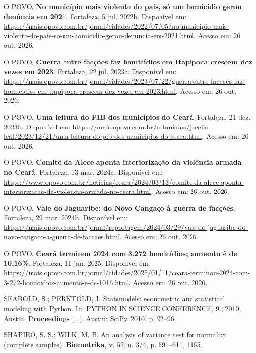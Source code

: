 \documentclass[12pt,a4paper]{article}
\begin{document}
\begin{description}
		\item O POVO. \textbf{No município mais violento do país, só um homicídio gerou denúncia em 2021}. Fortaleza, 5 jul. 2022b. Disponível em: \url{https://mais.opovo.com.br/jornal/cidades/2022/07/05/no-municipio-mais-violento-do-pais-so-um-homicidio-gerou-denuncia-em-2021.html}. Acesso em: 26 out. 2026.
		
		\item O POVO. \textbf{Guerra entre facções faz homicídios em Itapipoca crescem dez vezes em 2023}. Fortaleza, 22 jul. 2023a. Disponível em: \url{https://mais.opovo.com.br/jornal/cidades/2023/07/22/guerra-entre-faccoes-faz-homicidios-em-itapipoca-crescem-dez-vezes-em-2023.html}. Acesso em: 26 out. 2026.
		
		\item O POVO. \textbf{Uma leitura do PIB dos municípios do Ceará}. Fortaleza, 21 dez. 2023b. Disponível em: \url{https://mais.opovo.com.br/colunistas/jocelio-leal/2023/12/21/uma-leitura-do-pib-dos-municipios-do-ceara.html}. Acesso em: 26 out. 2026.
		
		\item O POVO. \textbf{Comitê da Alece aponta interiorização da violência armada no Ceará}. Fortaleza, 13 mar. 2024a. Disponível em: \url{https://www.opovo.com.br/noticias/ceara/2024/03/13/comite-da-alece-aponta-interiorizacao-da-violencia-armada-no-ceara.html}. Acesso em: 26 out. 2026.
		
		\item O POVO. \textbf{Vale do Jaguaribe: do Novo Cangaço à guerra de facções}. Fortaleza, 29 mar. 2024b. Disponível em: \url{https://mais.opovo.com.br/jornal/reportagem/2024/03/29/vale-do-jaguaribe-do-novo-cangaco-a-guerra-de-faccoes.html}. Acesso em: 26 out. 2026.
		
		\item O POVO. \textbf{Ceará terminou 2024 com 3.272 homicídios; aumento é de 10,16\%}. Fortaleza, 11 jan. 2025. Disponível em: \url{https://mais.opovo.com.br/jornal/cidades/2025/01/11/ceara-terminou-2024-com-3-272-homicidios-aumento-e-de-1016.html}. Acesso em: 26 out. 2026.
		
		\item SEABOLD, S.; PERKTOLD, J. Statsmodels: econometric and statistical modeling with Python. In: PYTHON IN SCIENCE CONFERENCE, 9., 2010, Austin. \textbf{Proceedings} [...]. Austin: SciPy, 2010. p. 92--96.
		
		\item SHAPIRO, S. S.; WILK, M. B. An analysis of variance test for normality (complete samples). \textbf{Biometrika}, v. 52, n. 3/4, p. 591--611, 1965.
	\end{description}
	
\end{document}
